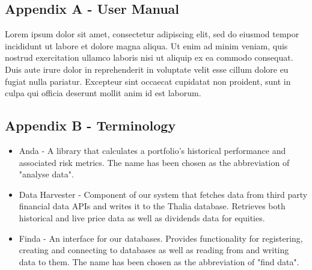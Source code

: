 \documentclass[main.tex]{subfiles}
\begin{document}
\subsection{Appendix A - User Manual}
Lorem ipsum dolor sit amet, consectetur adipiscing elit, sed do eiusmod tempor incididunt ut labore et dolore magna aliqua. Ut enim ad minim veniam, quis nostrud exercitation ullamco laboris nisi ut aliquip ex ea commodo consequat. Duis aute irure dolor in reprehenderit in voluptate velit esse cillum dolore eu fugiat nulla pariatur. Excepteur sint occaecat cupidatat non proident, sunt in culpa qui officia deserunt mollit anim id est laborum.

\subsection{Appendix B - Terminology}
\label{Terminology}

\begin{itemize}
    \item Anda - A library that calculates a portfolio's historical performance and associated risk metrics. The name has been chosen as the abbreviation of "analyse data".
    \item Data Harvester - Component of our system that fetches data from third party financial data APIs and writes it to the Thalia database. Retrieves both historical and live price data as well as dividends data for equities.
    \item Finda - An interface for our databases. Provides functionality for registering, creating and connecting to databases as well as reading from and writing data to them. The name has been chosen as the abbreviation of "find data".
\end{itemize}
\end{document}
